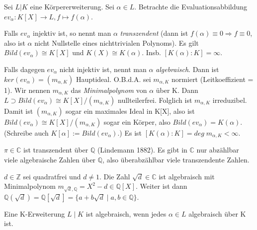 \documentclass[../main.tex]{subfiles}
\begin{document}
\begin{definition}
    Sei $L | K$ eine Körpererweiterung. Sei $\alpha \in L$. Betrachte die Evaluationsabbildung $ev_\alpha: K[X] \rightarrow L, f \mapsto f(\alpha)$. 
    
    Falls $ev_\alpha$ injektiv ist, so nennt man $\alpha$ \emph{transzendent} (dann ist $f(\alpha) \equiv 0 \Rightarrow f \equiv 0$, also ist $\alpha$ nicht Nullstelle eines nichttrivialen Polynoms). Es gilt $Bild(ev_\alpha) \cong K[X]$ und $K(X) \cong K(\alpha)$. Insb. $[K(\alpha):K] = \infty$.
    
    Falls dagegen $ev_\alpha$ nicht injektiv ist, nennt man $\alpha$ \emph{algebraisch}. Dann ist $ker(ev_\alpha) = (m_{\alpha, K})$ Hauptideal. O.B.d.A. sei $m_{\alpha, K}$ normiert (Leitkoeffizient = 1). Wir nennen $m_{\alpha, K}$ das \emph{Minimalpolynom} von $\alpha$ über K. Dann $L \supset Bild(ev_\alpha) \cong K[X]/(m_{\alpha, K})$ nullteilerfrei. Folglich ist $m_{\alpha, K}$ irreduzibel. Damit ist $(m_{\alpha, K})$ sogar ein maximales Ideal in K[X], also ist $Bild(ev_\alpha) \cong K[X]/(m_{\alpha, K})$ sogar ein Körper, also $Bild(ev_\alpha) = K(\alpha)$. (Schreibe auch $K[\alpha] := Bild(ev_\alpha)$.) Es ist $[K(\alpha):K] = deg \; m_{\alpha, K} < \infty$.
\end{definition}
\begin{example}
    $\pi \in \mathbb{C}$ ist transzendent über $\mathbb{Q}$ (Lindemann 1882). Es gibt in $\mathbb{C}$ nur abzählbar viele algebraische Zahlen über $\mathbb{Q}$, also überabzählbar viele transzendente Zahlen.

    $d \in \mathbb{Z}$ sei quadratfrei und $d \neq 1$. Die Zahl $\sqrt{d} \in \mathbb{C}$ ist algebraisch mit Minimalpolynom $m_{\sqrt{d}, \mathbb{Q}} = X^2 - d \in \mathbb{Q}[X]$. Weiter ist dann $\mathbb{Q}(\sqrt{d}) = \mathbb{Q}[\sqrt{d}] = \{a+b\sqrt{d} \mid a,b \in \mathbb{Q}\}$.
\end{example}
\begin{definition}
    Eine K-Erweiterung $L \mid K$ ist algebraisch, wenn jedes $\alpha \in L$ algebraisch über K ist.
\end{definition}
\end{document}
